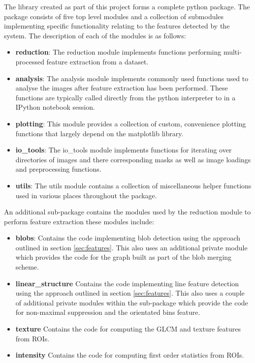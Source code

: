 The library created as part of this project forms a complete python package. The package consists of five top level modules and a collection of submodules implementing specific functionality relating to the features detected by the system. The description of each of the modules is as follows:

\begin{itemize}
	\item {\bf reduction}: The reduction module implements functions performing multi-processed feature extraction from a dataset.
	\item {\bf analysis}: The analysis module implements commonly used functions used to analyse the images after feature extraction has been performed. These functions are typically called directly from the python interpreter to in a IPython notebook session.
	\item {\bf plotting}: This module provides a collection of custom, convenience plotting functions that largely depend on the matplotlib library.
	\item {\bf io\_tools}: The io\_tools module implements functions for iterating over directories of images and there corresponding masks as well as image loadings and preprocessing functions.
	\item {\bf utils}: The utils module contains a collection of miscellaneous helper functions used in various places throughout the package.
\end{itemize}

An additional sub-package contains the modules used by the reduction module to perform feature extraction these modules include:

\begin{itemize}
	\item {\bf blobs}: Contains the code implementing blob detection using the approach outlined in section \ref{sec:features}. This also uses an additional private module which provides the code for the graph built as part of the blob merging scheme.
	\item {\bf linear\_structure} Contains the code implementing line feature detection using the approach outlined in section \ref{sec:features}. This also uses a couple of additional private modules within the sub-package which provide the code for non-maximal suppression and the orientated bins feature. 
	\item {\bf texture} Contains the code for computing the GLCM and texture features from ROIs.
	\item {\bf intensity} Contains the code for computing first order statistics from ROIs.
\end{itemize}

